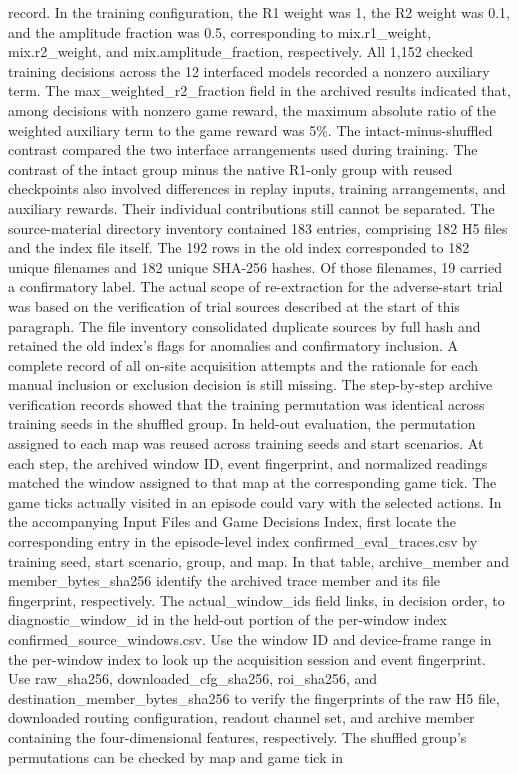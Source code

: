 \documentclass{article}
\begin{document}
record. In the training configuration, the R1 weight was 1, the R2 weight was 0.1, and the amplitude fraction was 0.5, corresponding to mix.r1\_\allowbreak{}weight, mix.r2\_\allowbreak{}weight, and mix.amplitude\_\allowbreak{}fraction, respectively. All 1,152 checked training decisions across the 12 interfaced models recorded a nonzero auxiliary term. The max\_\allowbreak{}weighted\_\allowbreak{}r2\_\allowbreak{}fraction field in the archived results indicated that, among decisions with nonzero game reward, the maximum absolute ratio of the weighted auxiliary term to the game reward was 5\%. The intact-minus-shuffled contrast compared the two interface arrangements used during training. The contrast of the intact group minus the native R1-only group with reused checkpoints also involved differences in replay inputs, training arrangements, and auxiliary rewards. Their individual contributions still cannot be separated. The source-material directory inventory contained 183 entries, comprising 182 H5 files and the index file itself. The 192 rows in the old index corresponded to 182 unique filenames and 182 unique SHA-256 hashes. Of those filenames, 19 carried a confirmatory label. The actual scope of re-extraction for the adverse-start trial was based on the verification of trial sources described at the start of this paragraph. The file inventory consolidated duplicate sources by full hash and retained the old index's flags for anomalies and confirmatory inclusion. A complete record of all on-site acquisition attempts and the rationale for each manual inclusion or exclusion decision is still missing. The step-by-step archive verification records showed that the training permutation was identical across training seeds in the shuffled group. In held-out evaluation, the permutation assigned to each map was reused across training seeds and start scenarios. At each step, the archived window ID, event fingerprint, and normalized readings matched the window assigned to that map at the corresponding game tick. The game ticks actually visited in an episode could vary with the selected actions. In the accompanying Input Files and Game Decisions Index, first locate the corresponding entry in the episode-level index confirmed\_\allowbreak{}eval\_\allowbreak{}traces.csv by training seed, start scenario, group, and map. In that table, archive\_\allowbreak{}member and member\_\allowbreak{}bytes\_\allowbreak{}sha256 identify the archived trace member and its file fingerprint, respectively. The actual\_\allowbreak{}window\_\allowbreak{}ids field links, in decision order, to diagnostic\_\allowbreak{}window\_\allowbreak{}id in the held-out portion of the per-window index confirmed\_\allowbreak{}source\_\allowbreak{}windows.csv. Use the window ID and device-frame range in the per-window index to look up the acquisition session and event fingerprint. Use raw\_\allowbreak{}sha256, downloaded\_\allowbreak{}cfg\_\allowbreak{}sha256, roi\_\allowbreak{}sha256, and destination\_\allowbreak{}member\_\allowbreak{}bytes\_\allowbreak{}sha256 to verify the fingerprints of the raw H5 file, downloaded routing configuration, readout channel set, and archive member containing the four-dimensional features, respectively. The shuffled group's permutations can be checked by map and game tick in 
\end{document}
